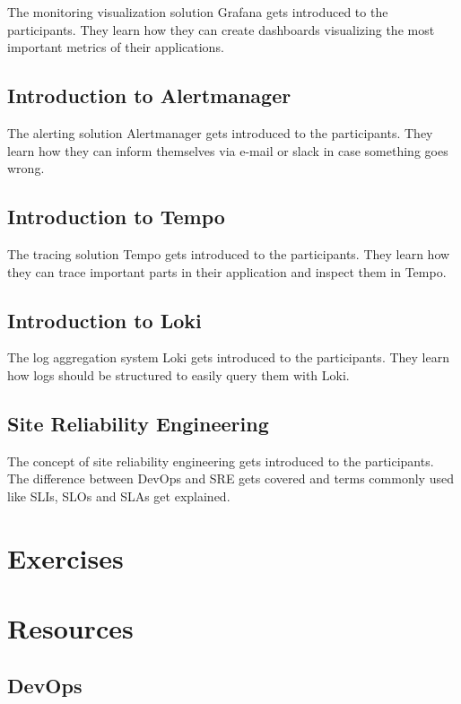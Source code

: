 \documentclass{article}
\begin{document}
The monitoring visualization solution Grafana gets introduced to the
participants. They learn how they can create dashboards visualizing the most
important metrics of their applications.

\subsection{Introduction to Alertmanager}

The alerting solution Alertmanager gets introduced to the participants. They
learn how they can inform themselves via e-mail or slack in case something goes
wrong.

\subsection{Introduction to Tempo}

The tracing solution Tempo gets introduced to the participants. They learn how
they can trace important parts in their application and inspect them in Tempo.

\subsection{Introduction to Loki}

The log aggregation system Loki gets introduced to the participants. They learn
how logs should be structured to easily query them with Loki.

\subsection{Site Reliability Engineering}

The concept of site reliability engineering gets introduced to the participants.
The difference between DevOps and SRE gets covered and terms commonly used like
SLIs, SLOs and SLAs get explained.

\newpage

\section{Exercises}

\newpage

\section{Resources}

\subsection{DevOps}
\end{document}
